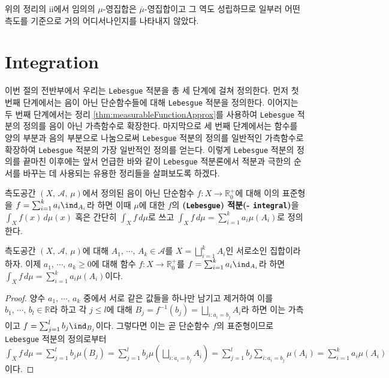 위의 정리의 ii에서 임의의 $\mu$-영집합은 $\overline{\mu}$-영집합이고 그 역도 성립하므로 일부러 어떤 측도를 기준으로 거의 어디서나인지를 나타내지 않았다.

\section{Integration}

이번 절의 전반부에서 우리는 \texttt{Lebesgue} 적분을 총 세 단계에 걸쳐 정의한다. 먼저 첫 번째 단계에서는 음이 아닌 단순함수들에 대해 \texttt{Lebesgue} 적분을 정의한다. 이어지는 두 번째 단계에서는 정리 \ref{thm:measurableFunctionApprox}를 사용하여 \texttt{Lebesgue} 적분의 정의를 음이 아닌 가측함수로 확장한다. 마지막으로 세 번째 단계에서는 함수를 양의 부분과 음의 부분으로 나눔으로써 \texttt{Lebesgue} 적분의 정의를 일반적인 가측함수로 확장하여 \texttt{Lebesgue} 적분의 가장 일반적인 정의를 얻는다. 이렇게 \texttt{Lebesgue} 적분의 정의를 끝마친 이후에는 앞서 언급한 바와 같이 \texttt{Lebesgue} 적분론에서 적분과 극한의 순서를 바꾸는 데 사용되는 유용한 정리들을 살펴보도록 하겠다.

\begin{definition}
    측도공간 $(X,\,\mathcal{A},\,\mu)$에서 정의된 음이 아닌 단순함수 $f:X\to\mathbb{R}^+_0$에 대해 이의 표준형을 $f=\sum_{i=1}^ka_i\ind_{A_i}$라 하면 이때 $\mu$에 대한 $f$의 \textbf{(\texttt{Lebesgue}) 적분(- \texttt{integral})}을 $\int_Xf(x)\,d\mu(x)$ 혹은 간단히 $\int_Xf\,d\mu$로 쓰고 $\int_Xf\,d\mu=\sum_{i=1}^ka_i\mu(A_i)$로 정의한다.
\end{definition}

\begin{proposition}\label{prop:simpleFunctionIntegral}
    측도공간 $(X,\,\mathcal{A},\,\mu)$에 대해 $A_1,\,\cdots,\,A_k\in\mathcal{A}$를 $X=\bigsqcup_{i=1}^kA_i$인 서로소인 집합이라 하자. 이제 $a_1,\,\cdots,\,a_k\geq0$에 대해 함수 $f:X\to\mathbb{R}^+_0$를 $f=\sum_{i=1}^ka_i\ind_{A_i}$라 하면 $\int_Xf\,d\mu=\sum_{i=1}^ka_i\mu(A_i)$이다.
\end{proposition}

\begin{proof}
    양수 $a_1,\,\cdots,\,a_k$ 중에서 서로 같은 값들을 하나만 남기고 제거하여 이를 $b_1,\,\cdots,\,b_l\in\mathbb{R}$라 하고 각 $j\leq l$에 대해 $B_j=f^{-1}(b_j)=\bigsqcup_{i:a_i=b_j}A_i$라 하면 이는 가측이고 $f=\sum_{j=1}^lb_j\ind_{B_j}$이다. 그렇다면 이는 곧 단순함수 $f$의 표준형이므로 \texttt{Lebesgue} 적분의 정의로부터 $\int_Xf\,d\mu=\sum_{j=1}^lb_j\mu(B_j)=\sum_{j=1}^lb_j\mu(\bigsqcup_{i:a_i=b_j}A_i)=\sum_{j=1}^lb_j\sum_{i:a_i=b_j}\mu(A_i)=\sum_{i=1}^ka_i\mu(A_i)$이다.
\end{proof}


